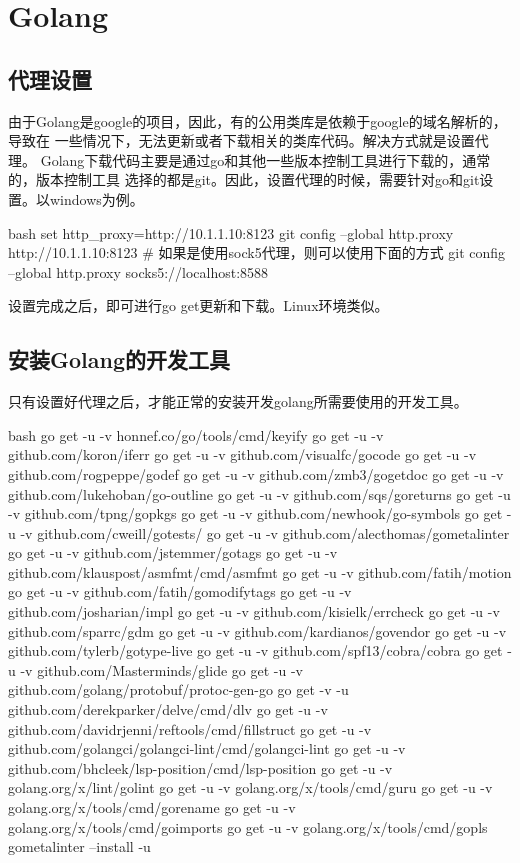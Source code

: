 \chapter{Golang}

\section{代理设置}
由于Golang是google的项目，因此，有的公用类库是依赖于google的域名解析的，导致在
一些情况下，无法更新或者下载相关的类库代码。解决方式就是设置代理。
Golang下载代码主要是通过go和其他一些版本控制工具进行下载的，通常的，版本控制工具
选择的都是git。因此，设置代理的时候，需要针对go和git设置。以windows为例。
\begin{code-block}{bash}
set http_proxy=http://10.1.1.10:8123
git config --global http.proxy http://10.1.1.10:8123
# 如果是使用sock5代理，则可以使用下面的方式
git config --global http.proxy socks5://localhost:8588
\end{code-block}

设置完成之后，即可进行go get更新和下载。Linux环境类似。

\section{安装Golang的开发工具}
只有设置好代理之后，才能正常的安装开发golang所需要使用的开发工具。
\begin{code-block}{bash}
go get -u -v honnef.co/go/tools/cmd/keyify
go get -u -v github.com/koron/iferr
go get -u -v github.com/visualfc/gocode
go get -u -v github.com/rogpeppe/godef
go get -u -v github.com/zmb3/gogetdoc
go get -u -v github.com/lukehoban/go-outline
go get -u -v github.com/sqs/goreturns
go get -u -v github.com/tpng/gopkgs
go get -u -v github.com/newhook/go-symbols
go get -u -v github.com/cweill/gotests/
go get -u -v github.com/alecthomas/gometalinter
go get -u -v github.com/jstemmer/gotags
go get -u -v github.com/klauspost/asmfmt/cmd/asmfmt
go get -u -v github.com/fatih/motion
go get -u -v github.com/fatih/gomodifytags
go get -u -v github.com/josharian/impl
go get -u -v github.com/kisielk/errcheck
go get -u -v github.com/sparrc/gdm
go get -u -v github.com/kardianos/govendor
go get -u -v github.com/tylerb/gotype-live
go get -u -v github.com/spf13/cobra/cobra
go get -u -v github.com/Masterminds/glide
go get -u -v github.com/golang/protobuf/protoc-gen-go
go get -v -u github.com/derekparker/delve/cmd/dlv
go get -u -v github.com/davidrjenni/reftools/cmd/fillstruct
go get -u -v github.com/golangci/golangci-lint/cmd/golangci-lint
go get -u -v github.com/bhcleek/lsp-position/cmd/lsp-position
go get -u -v golang.org/x/lint/golint
go get -u -v golang.org/x/tools/cmd/guru
go get -u -v golang.org/x/tools/cmd/gorename
go get -u -v golang.org/x/tools/cmd/goimports
go get -u -v golang.org/x/tools/cmd/gopls
gometalinter --install -u
\end{code-block}


